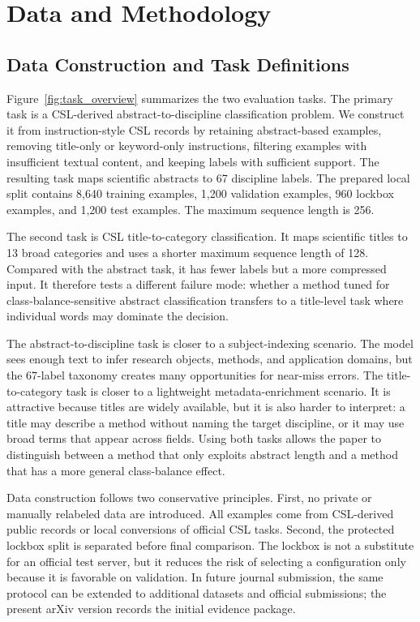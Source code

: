 \documentclass[10pt]{article}
\begin{document}
\section{Data and Methodology}

\subsection{Data Construction and Task Definitions}

Figure~\ref{fig:task_overview} summarizes the two evaluation tasks. The primary task is a CSL-derived abstract-to-discipline classification problem. We construct it from instruction-style CSL records by retaining abstract-based examples, removing title-only or keyword-only instructions, filtering examples with insufficient textual content, and keeping labels with sufficient support. The resulting task maps scientific abstracts to 67 discipline labels. The prepared local split contains 8,640 training examples, 1,200 validation examples, 960 lockbox examples, and 1,200 test examples. The maximum sequence length is 256.

The second task is CSL title-to-category classification. It maps scientific titles to 13 broad categories and uses a shorter maximum sequence length of 128. Compared with the abstract task, it has fewer labels but a more compressed input. It therefore tests a different failure mode: whether a method tuned for class-balance-sensitive abstract classification transfers to a title-level task where individual words may dominate the decision.

The abstract-to-discipline task is closer to a subject-indexing scenario. The model sees enough text to infer research objects, methods, and application domains, but the 67-label taxonomy creates many opportunities for near-miss errors. The title-to-category task is closer to a lightweight metadata-enrichment scenario. It is attractive because titles are widely available, but it is also harder to interpret: a title may describe a method without naming the target discipline, or it may use broad terms that appear across fields. Using both tasks allows the paper to distinguish between a method that only exploits abstract length and a method that has a more general class-balance effect.

Data construction follows two conservative principles. First, no private or manually relabeled data are introduced. All examples come from CSL-derived public records or local conversions of official CSL tasks. Second, the protected lockbox split is separated before final comparison. The lockbox is not a substitute for an official test server, but it reduces the risk of selecting a configuration only because it is favorable on validation. In future journal submission, the same protocol can be extended to additional datasets and official submissions; the present arXiv version records the initial evidence package.
\end{document}
